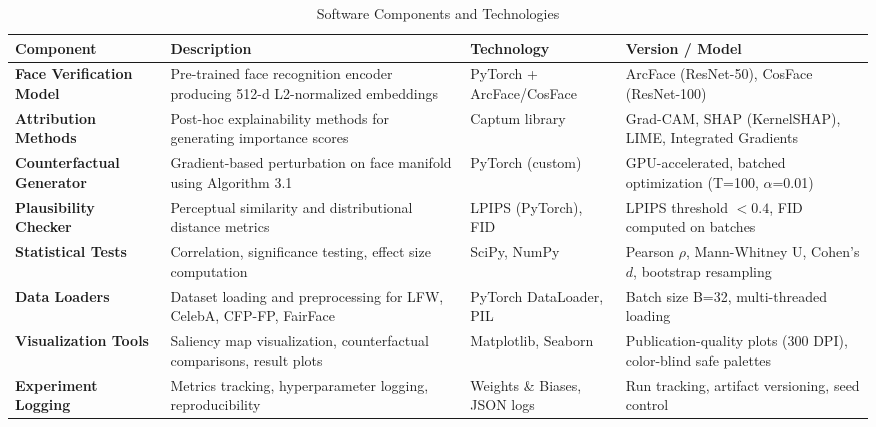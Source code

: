 
\begin{table}[htbp]
\centering
\caption{Software Components and Technologies}
\label{tab:software_components}
\small
\begin{tabularx}{\textwidth}{lXlp{}}
\toprule
\textbf{Component} & \textbf{Description} & \textbf{Technology} & \textbf{Version / Model} \\
\midrule
\textbf{Face Verification Model} & Pre-trained face recognition encoder producing 512-d L2-normalized embeddings & PyTorch + ArcFace/CosFace & ArcFace (ResNet-50), CosFace (ResNet-100) \\[6pt]

\textbf{Attribution Methods} & Post-hoc explainability methods for generating importance scores & Captum library & Grad-CAM, SHAP (KernelSHAP), LIME, Integrated Gradients \\[6pt]

\textbf{Counterfactual Generator} & Gradient-based perturbation on face manifold using Algorithm 3.1 & PyTorch (custom) & GPU-accelerated, batched optimization (T=100, $\alpha$=0.01) \\[6pt]

\textbf{Plausibility Checker} & Perceptual similarity and distributional distance metrics & LPIPS (PyTorch), FID & LPIPS threshold $<0.4$, FID computed on batches \\[6pt]

\textbf{Statistical Tests} & Correlation, significance testing, effect size computation & SciPy, NumPy & Pearson $\rho$, Mann-Whitney U, Cohen's $d$, bootstrap resampling \\[6pt]

\textbf{Data Loaders} & Dataset loading and preprocessing for LFW, CelebA, CFP-FP, FairFace & PyTorch DataLoader, PIL & Batch size B=32, multi-threaded loading \\[6pt]

\textbf{Visualization Tools} & Saliency map visualization, counterfactual comparisons, result plots & Matplotlib, Seaborn & Publication-quality plots (300 DPI), color-blind safe palettes \\[6pt]

\textbf{Experiment Logging} & Metrics tracking, hyperparameter logging, reproducibility & Weights \& Biases, JSON logs & Run tracking, artifact versioning, seed control \\

\bottomrule
\end{tabularx}
\end{table}

